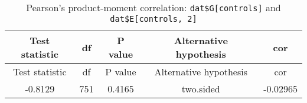 \documentclass[11pt,]{article}
\begin{document}
\begin{longtable}[]{@{}ccccc@{}}
\caption{Pearson's product-moment correlation:
\texttt{dat\$G{[}controls{]}} and
\texttt{dat\$E{[}controls,\ 2{]}}}\tabularnewline
\toprule
\begin{minipage}[b]{0.20\columnwidth}\centering\strut
Test statistic\strut
\end{minipage} & \begin{minipage}[b]{0.07\columnwidth}\centering\strut
df\strut
\end{minipage} & \begin{minipage}[b]{0.12\columnwidth}\centering\strut
P value\strut
\end{minipage} & \begin{minipage}[b]{0.30\columnwidth}\centering\strut
Alternative hypothesis\strut
\end{minipage} & \begin{minipage}[b]{0.12\columnwidth}\centering\strut
cor\strut
\end{minipage}\tabularnewline
\midrule
\endfirsthead
\toprule
\begin{minipage}[b]{0.20\columnwidth}\centering\strut
Test statistic\strut
\end{minipage} & \begin{minipage}[b]{0.07\columnwidth}\centering\strut
df\strut
\end{minipage} & \begin{minipage}[b]{0.12\columnwidth}\centering\strut
P value\strut
\end{minipage} & \begin{minipage}[b]{0.30\columnwidth}\centering\strut
Alternative hypothesis\strut
\end{minipage} & \begin{minipage}[b]{0.12\columnwidth}\centering\strut
cor\strut
\end{minipage}\tabularnewline
\midrule
\endhead
\begin{minipage}[t]{0.20\columnwidth}\centering\strut
-0.8129\strut
\end{minipage} & \begin{minipage}[t]{0.07\columnwidth}\centering\strut
751\strut
\end{minipage} & \begin{minipage}[t]{0.12\columnwidth}\centering\strut
0.4165\strut
\end{minipage} & \begin{minipage}[t]{0.30\columnwidth}\centering\strut
two.sided\strut
\end{minipage} & \begin{minipage}[t]{0.12\columnwidth}\centering\strut
-0.02965\strut
\end{minipage}\tabularnewline
\bottomrule
\end{longtable}
\end{document}
